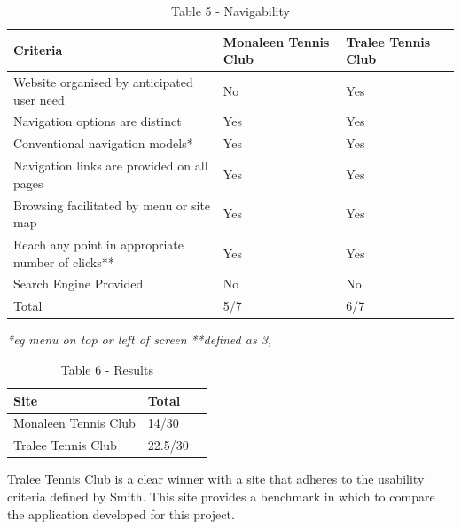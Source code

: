 \begin{table}[H]
\caption{Table 5 - Navigability}
\begin{center}
    \begin{tabular}{ | l | l | l | p{5cm} |}
    \hline
	\textbf{Criteria} & \textbf{Monaleen Tennis Club} & \textbf{Tralee Tennis Club}\\ \hline
	Website organised by anticipated user need & No & Yes\\ \hline
	Navigation options are distinct& Yes & Yes\\ \hline
	Conventional navigation models*& Yes & Yes\\ \hline
	Navigation links are provided on all pages & Yes & Yes\\ \hline
	Browsing facilitated by menu or site map &Yes & Yes\\ \hline
	Reach any point in appropriate number of clicks** & Yes & Yes\\ \hline
	Search Engine Provided & No & No\\ \hline
	Total & 5/7 & 6/7\\ \hline	
    \end{tabular}
\end{center}
\label{fig:table5}
\end{table}
\textit{*eg menu on top or left of screen}\newline
\textit{**defined as 3,} \cite{smith2001applying}

\begin{table}[H]
\caption{Table 6 - Results}
\begin{center}
    \begin{tabular}{ | l | l | p{5cm} |}
    \hline
	Site & Total\\ \hline
	Monaleen Tennis Club & 14/30\\ \hline
	Tralee Tennis Club & 22.5/30\\ \hline	
    \end{tabular}
\end{center}
\label{fig:table6}
\end{table}

Tralee Tennis Club is a clear winner with a site that adheres to the usability criteria defined by Smith. This site provides a benchmark in which to compare the application developed for this project.